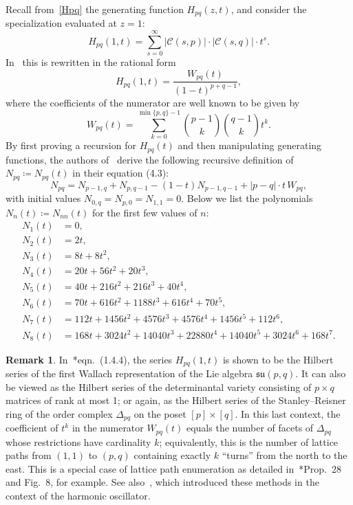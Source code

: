 \documentclass[11pt]{amsart}
\theoremstyle{plain}
\theoremstyle{definition}
\newtheorem{rem}[theorem]{Remark}
\numberwithin{equation}{section}
\newcommand{\C}{\mathcal{C}}
\begin{document}
Recall from~\eqref{Hpq} the generating function $H_{pq}(z,t)$, and consider the specialization evaluated at $z=1$:
\begin{equation}
    \label{Hpq(1)}
    H_{pq}(1,t) = \sum_{s = 0}^\infty |\C(s,p)| \cdot |\C(s,q)| \cdot t^s.
\end{equation}
In~\cite{BW} this is rewritten in the rational form
\[
    H_{pq}(1,t) = \frac{W_{pq}(t)}{(1-t)^{p+q-1}},
\]
where the coefficients of the numerator are well known to be given by
    \begin{equation}
    \label{Wpq}
    W_{pq}(t) = \sum_{k=0}^{\min\{p,q\}-1} \binom{p-1}{k} \binom{q-1}{k} t^k.
    \end{equation}
By first proving a recursion for $H_{pq}(t)$ and then manipulating generating functions, the authors of~\cite{BW} derive the following recursive definition of $N_{pq} \coloneqq N_{pq}(t)$ in their equation (4.3):
\begin{equation}
    \label{Npq recursion}
    N_{pq} = N_{p-1,q} + N_{p,q-1} - (1-t)N_{p-1,q-1} + |p-q| \cdot t \, W_{pq},
\end{equation}
with initial values $N_{0,q} = N_{p,0} = N_{1,1} = 0$.
Below we list the polynomials $N_n(t) \coloneqq N_{nn}(t)$ for the first few values of $n$:
\begin{align*}
    N_1(t) &= 0,\\
    N_2(t) &= 2t,\\
    N_3(t) &= 8t + 8t^2,\\
    N_4(t) &= 20t + 56t^2 + 20t^3,\\
    N_5(t) &= 40t + 216t^2 + 216t^3 + 40t^4,\\
    N_6(t) &= 70 t + 616 t^2 + 1188 t^3 + 616 t^4 + 70 t^5, \\
    N_7(t) &= 112 t + 1456 t^2 + 4576 t^3 + 4576 t^4 + 1456 t^5 + 112 t^6,\\
    N_8(t) &= 168 t + 3024 t^2 + 14040 t^3 + 22880 t^4 + 14040 t^5 + 3024 t^6 + 
 168 t^7.
\end{align*}

\begin{rem}
In~\cite{EW04}*{eqn.~\!(1.4.4)}, the series $H_{pq}(1,t)$ is shown to be the Hilbert series of the first Wallach representation of the Lie algebra $\mathfrak{su}(p,q)$.
It can also be viewed as the Hilbert series of the determinantal variety consisting of $p \times q$ matrices of rank at most 1; or again, as the Hilbert series of the Stanley--Reisner ring of the order complex $\Delta_{pq}$ on the poset $[p] \times [q]$.
In this last context, the coefficient of $t^k$ in the numerator $W_{pq}(t)$ equals the number of facets of $\Delta_{pq}$ whose restrictions have cardinality $k$; equivalently, this is the number of lattice paths from $(1,1)$ to $(p,q)$ containing exactly $k$ ``turns'' from the north to the east.
This is a special case of lattice path enumeration as detailed in~\cite{Krattenthaler}*{Prop.~28 and Fig.~8}, for example.
See also~\cite{Billera}, which introduced these methods in the context of the harmonic oscillator.
\end{rem}
\end{document}
